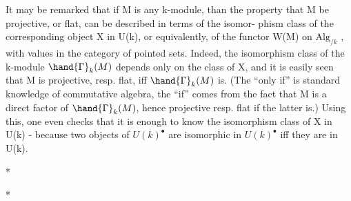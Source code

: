 
It may be remarked that if M is any k-module,  than the property
that M be projective,  or flat,  can be described in terms of the isomor-%
phism class of the corresponding object X in U(k)\hand{$^\bullet$},  or equivalently, of
the functor W(M) on $\mathrm{Alg}_{/k}$ ,  with values in the category of pointed sets.
Indeed, the isomorphism class of the k-module $\hand{\Gamma}_k(M)$  depends only on the
class of X,  and it is easily seen that M is projective, resp. flat, iff
$\hand{\Gamma}_k(M)$ is.  (The ``only if'' is standard knowledge of commutative algebra,
the ``if'' comes from the fact that M is a direct factor of $\hand{\Gamma}_k(M)$,  hence
projective resp. flat if the latter is.)  Using this,  one even checks
that it is enough to know the isomorphism class of X in U(k)  -  because
two objects of $U(k)^\bullet$  are isomorphic in $U(k)^\bullet$  iff they are in U(k).

* \quad *

*

